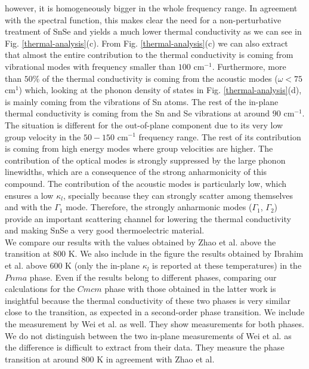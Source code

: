 however, it is homogeneously bigger in the whole frequency range. In agreement with the spectral function, this
makes clear the need for a non-perturbative treatment of SnSe and yields a much lower thermal conductivity as we can
see in Fig. \ref{thermal-analysis}(c). From Fig. \ref{thermal-analysis}(c) we can also extract that almost the entire
contribution to the thermal conductivity is coming from vibrational modes with frequency smaller than $100$ cm$^{-1}$. Furthermore, more than $50\%$ of the thermal conductivity is coming from the acoustic modes
($\omega<75$ cm$^{1}$) which, looking at the phonon density of states in Fig. \ref{thermal-analysis}(d), is mainly
coming from the vibrations of Sn atoms. The rest of the in-plane thermal conductivity is coming from the Sn and Se
vibrations at around $90$ cm$^{-1}$. The situation is different for the out-of-plane component due to its very low
group velocity in the $50-150$ cm$^{-1}$ frequency range. The rest of its contribution is coming from high energy
modes where group velocities are higher. The contribution of the optical modes is strongly suppressed by the large
phonon linewidths, which are a consequence of the strong anharmonicity of this compound. The contribution of the
acoustic modes is particularly low, which ensures a low $\kappa_l$, specially because they can strongly scatter
among themselves and with the $\Gamma_1$ mode. Therefore, the strongly anharmonic modes ($\Gamma_{1}$, $\Gamma_{2}$)
provide an important scattering channel for lowering the thermal conductivity and making SnSe a very good
thermoelectric material. \\

We compare our results with the values obtained by Zhao et al.\cite{zhao2014ultralow} above the transition at $800$ K. We also include in the figure the results obtained by Ibrahim et al.\cite{ibrahim2017reinvestigation} above $600$ K (only the in-plane $\kappa_l$ is reported at these temperatures) in the $Pnma$ phase. Even if the results belong to different phases, comparing our calculations for the $Cmcm$ phase with those obtained in the latter work is insightful because the thermal conductivity of these two phases is very similar close to the transition, as expected in a second-order phase transition. We include the measurement by Wei et al.\cite{wei2019thermoelectric} as well. They show 
measurements for both phases. We do not distinguish between the two in-plane measurements of Wei et al. as the 
difference is difficult to extract from their data. They measure the phase transition at around $800$ K in agreement 
with Zhao et al. \\

